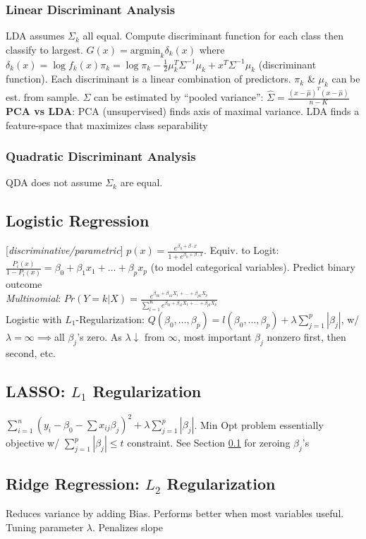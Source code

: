 \documentclass[9pt]{article}
\theoremstyle{definition}
\begin{document}
\begin{multicols}{2}
\subsubsection{Linear Discriminant Analysis}
LDA assumes $\Sigma_k$ all equal. Compute discriminant function for each class then classify to largest. $G(x)=\text{argmin}_k\delta_k(x)$ where $\delta_k(x) = \log f_k(x)\pi_k = \log\pi_k-\frac{1}{2}\mu_k^T\Sigma^{-1}\mu_k+x^T\Sigma^{-1}\mu_k$ (discriminant function).   Each discriminant is a linear combination of predictors. $\pi_k$ \& $\mu_k$ can be est. from sample. $\Sigma$ can be estimated by ``pooled variance'': $\hat \Sigma=\frac{(x-\hat \mu)^T(x-\hat \mu)}{n-K}$ \\
\textbf{PCA vs LDA}: PCA (unsupervised) finds axis of maximal variance. LDA finds a feature-space that maximizes class separability
\subsubsection{Quadratic Discriminant Analysis}
QDA does not assume $\Sigma_k$ are equal.
\subsection{Logistic Regression}\label{sect:LogR}
[\textit{discriminative/parametric}] ${\displaystyle p(x) = \frac{e^{\beta_0+\beta\cdot x}}{1+e^{\beta_0+\beta\cdot x}}}$. Equiv. to Logit: $\frac{P_i(x)}{1-P_i(x)}= \beta_0+\beta_1x_1+\dots+\beta_px_p$ (to model categorical variables). Predict binary outcome\\
\textit{Multinomial}: $Pr(Y=k|X)={\displaystyle \frac{e^{\beta_{0k}+\beta_{1k}X_1+\dots+\beta_{pk}X_p}}{\sum_{l=1}^Ke^{\beta_{0l}+\beta_{1l}X_1+\dots+\beta_{pl}X_p}}}$\\
Logistic with $L_1$-Regularization: $Q(\beta_0,\dots,\beta_p)=l(\beta_0,\dots,\beta_p)+\lambda\sum_{j=1}^p|\beta_j|$, w/ $\lambda=\infty \implies$all $\beta_j$'s zero. As $\lambda\downarrow$ from $\infty$, most important $\beta_j$ nonzero first, then second, etc.
\subsection{LASSO: $L_1$ Regularization} 
$\sum_{i=1}^n\left(y_i-\beta_0-\sum x_{ij}\beta_j\right)^2+\lambda\sum_{j=1}^p|\beta_j|$.  Min Opt problem essentially objective w/ $\sum_{j=1}^p|\beta_j|\leq t$ constraint. See Section \ref{sect:LogR} for zeroing $\beta_j$'s
\subsection{Ridge Regression: $L_2$ Regularization} Reduces variance by adding Bias. Performs better when most variables useful.  Tuning parameter $\lambda$. Penalizes slope

\end{multicols}
\end{document}
